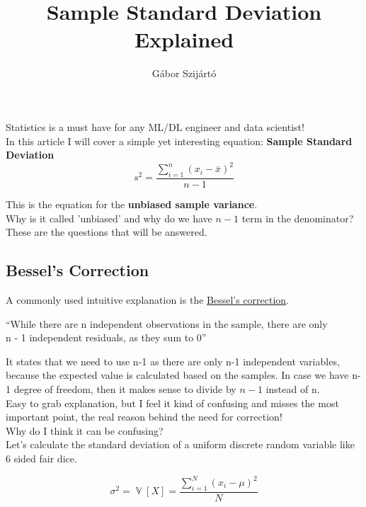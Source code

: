 \documentclass[12pt, a4paper, twoside]{article}
\author{Gábor Szijártó}
\title{Sample Standard Deviation Explained}
\date{}
\DeclareMathOperator{\srexvar}{\mathbb{V}}
\newcommand\srvar[1]{\srexvar\left[#1\right]}
\begin{document}
\srdocsimple

Statistics is a must have for any ML/DL engineer and data scientist!\\
In this article I will cover a simple yet interesting equation: \textbf{Sample Standard Deviation}\\

\begin{equation}
	s^2 = \frac{\sum_{i=1}^{n}(x_i - \bar{x})^2}{n - 1}
\end{equation}

This is the equation for the \textbf{unbiased sample variance}.\\
Why is it called 'unbiased' and why do we have $n-1$ term in the denominator?\\
These are the questions that will be answered.


\subsection*{Bessel's Correction}

A commonly used intuitive explanation is the  \href{https://en.wikipedia.org/wiki/Bessel\%27s\_correction#Source\_of\_bias}{Bessel's correction}.

\begin{displayquote}
\begin{mdframed}[style=srquotesty]
\enquote{While there are n independent observations in the sample, there are only\\ n - 1 independent residuals, as they sum to 0}
\end{mdframed}
\end{displayquote}

It states that we need to use n-1 as there are only n-1 independent variables, because the expected value is calculated based on the samples. In case we have n-1 degree of freedom, then it makes sense to divide by $n-1$ instead of n.\\

Easy to grab explanation, but I feel it kind of confusing and misses the most important point, the real reason behind the need for correction!\\

Why do I think it can be confusing?\\
Let's calculate the standard deviation of a uniform discrete random variable like 6 sided fair dice.

\begin{equation}
	\sigma^2 = \srvar{X} = \frac{\sum_{i=1}^{N}(x_i - \mu)^2}{N}
\end{equation}
\end{document}
